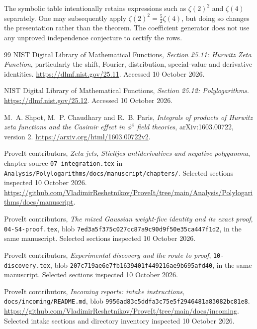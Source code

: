 \documentclass[11pt]{article}
\numberwithin{equation}{section}
\theoremstyle{definition}
\theoremstyle{remark}
\newcommand{\file}[1]{\nolinkurl{#1}}
\begin{document}
The symbolic table intentionally retains expressions such as
$\zeta(2)^2$ and $\zeta(4)$ separately. One may subsequently apply
$\zeta(2)^2=\tfrac52\zeta(4)$, but doing so changes the presentation
rather than the theorem. The coefficient generator does not use any
unproved independence conjecture to certify the rows.

\begin{thebibliography}{99}
NIST Digital Library of Mathematical Functions,
\emph{Section 25.11: Hurwitz Zeta Function}, particularly the shift,
Fourier, distribution, special-value and derivative identities.
\url{https://dlmf.nist.gov/25.11}. Accessed 10 October 2026.

NIST Digital Library of Mathematical Functions,
\emph{Section 25.12: Polylogarithms}.
\url{https://dlmf.nist.gov/25.12}. Accessed 10 October 2026.

M.~A. Shpot, M.~P. Chaudhary and R.~B. Paris,
\emph{Integrals of products of Hurwitz zeta functions and the Casimir
effect in $\phi^4$ field theories}, arXiv:1603.00722, version 2.
\url{https://arxiv.org/html/1603.00722v2}.

ProveIt contributors,
\emph{Zeta jets, Stieltjes antiderivatives and negative polygamma},
chapter source \file{07-integration.tex} in
\file{Analysis/Polylogarithms/docs/manuscript/chapters/}.
Selected sections inspected 10 October 2026.
\url{https://github.com/VladimirReshetnikov/ProveIt/tree/main/Analysis/Polylogarithms/docs/manuscript}.

ProveIt contributors,
\emph{The mixed Gaussian weight-five identity and its exact proof},
\file{04-S4-proof.tex}, blob
\file{7ed3a5f375c027cc87a9c90d9f50e35ca447f1d2}, in the same manuscript.
Selected sections inspected 10 October 2026.

ProveIt contributors,
\emph{Experimental discovery and the route to proof},
\file{10-discovery.tex}, blob
\file{207c719ae6e7fb1639401f449216ae9b695afd40}, in the same manuscript.
Selected sections inspected 10 October 2026.

ProveIt contributors,
\emph{Incoming reports: intake instructions},
\file{docs/incoming/README.md}, blob
\file{9956ad83c5ddfa3c75e5f2946481a83082bc81e8}.
\url{https://github.com/VladimirReshetnikov/ProveIt/tree/main/docs/incoming}.
Selected intake sections and directory inventory inspected 10 October 2026.
\end{thebibliography}
\end{document}
